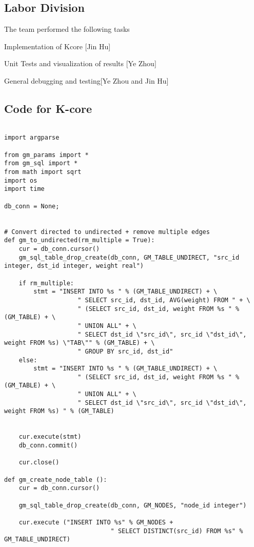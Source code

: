 
\subsection{Labor Division}

The team performed the following tasks
\bit
\item Implementation of Kcore [Jin Hu]
\item Unit Tests and visualization of results [Ye Zhou]
\item General debugging and testing[Ye Zhou and Jin Hu]
\eit

\subsection{Code for K-core}

\begin{lstlisting}

import argparse

from gm_params import *
from gm_sql import *
from math import sqrt
import os
import time

db_conn = None;


# Convert directed to undirected + remove multiple edges
def gm_to_undirected(rm_multiple = True):
    cur = db_conn.cursor()
    gm_sql_table_drop_create(db_conn, GM_TABLE_UNDIRECT, "src_id integer, dst_id integer, weight real")

    if rm_multiple:
        stmt = "INSERT INTO %s " % (GM_TABLE_UNDIRECT) + \
                    " SELECT src_id, dst_id, AVG(weight) FROM " + \
                    " (SELECT src_id, dst_id, weight FROM %s " % (GM_TABLE) + \
                    " UNION ALL" + \
                    " SELECT dst_id \"src_id\", src_id \"dst_id\", weight FROM %s) \"TAB\"" % (GM_TABLE) + \
                    " GROUP BY src_id, dst_id"
    else:
        stmt = "INSERT INTO %s " % (GM_TABLE_UNDIRECT) + \
                    " (SELECT src_id, dst_id, weight FROM %s " % (GM_TABLE) + \
                    " UNION ALL" + \
                    " SELECT dst_id \"src_id\", src_id \"dst_id\", weight FROM %s) " % (GM_TABLE)


    cur.execute(stmt)
    db_conn.commit()

    cur.close()

def gm_create_node_table ():
    cur = db_conn.cursor()

    gm_sql_table_drop_create(db_conn, GM_NODES, "node_id integer")

    cur.execute ("INSERT INTO %s" % GM_NODES +
                             " SELECT DISTINCT(src_id) FROM %s" % GM_TABLE_UNDIRECT)


\end{lstlisting}
